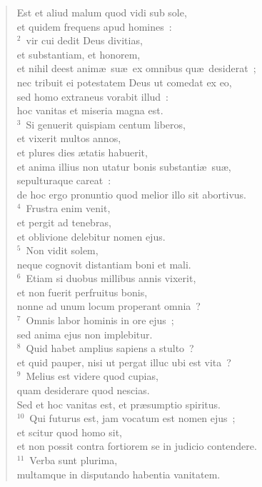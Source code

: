 \begin{flushleft}\begin{verse}\vspace{-19pt}Est et aliud malum quod vidi sub sole,\\ et quidem frequens apud homines~:\\
${}^{2}$~vir cui dedit Deus divitias,\\ et substantiam, et honorem,\\ et nihil deest anim\ae\ su\ae\ ex omnibus qu\ae\ desiderat~;\\ nec tribuit ei potestatem Deus ut comedat ex eo,\\ sed homo extraneus vorabit illud~:\\ hoc vanitas et miseria magna est.\\
${}^{3}$~Si genuerit quispiam centum liberos,\\ et vixerit multos annos,\\ et plures dies \ae tatis habuerit,\\ et anima illius non utatur bonis substanti\ae\ su\ae ,\\ sepulturaque careat~:\\ de hoc ergo pronuntio quod melior illo sit abortivus.\\
${}^{4}$~Frustra enim venit,\\ et pergit ad tenebras,\\ et oblivione delebitur nomen ejus.\\
${}^{5}$~Non vidit solem,\\ neque cognovit distantiam boni et mali.\\
${}^{6}$~Etiam si duobus millibus annis vixerit,\\ et non fuerit perfruitus bonis,\\ nonne ad unum locum properant omnia~?\\
${}^{7}$~Omnis labor hominis in ore ejus~;\\ sed anima ejus non implebitur.\\
${}^{8}$~Quid habet amplius sapiens a stulto~?\\ et quid pauper, nisi ut pergat illuc ubi est vita~?\\
${}^{9}$~Melius est videre quod cupias,\\ quam desiderare quod nescias.\\ Sed et hoc vanitas est, et pr\ae sumptio spiritus.\\
${}^{10}$~Qui futurus est, jam vocatum est nomen ejus~;\\ et scitur quod homo sit,\\ et non possit contra fortiorem se in judicio contendere.\\
${}^{11}$~Verba sunt plurima,\\ multamque in disputando habentia vanitatem.\end{verse}\end{flushleft}


